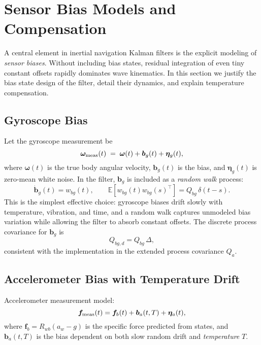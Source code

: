\documentclass[11pt]{article}
\begin{document}
\section{Sensor Bias Models and Compensation}
\label{sec:biases}

A central element in inertial navigation Kalman filters is the explicit modeling of 
\emph{sensor biases}. Without including bias states, residual integration of even tiny 
constant offsets rapidly dominates wave kinematics. In this section we justify the bias 
state design of the filter, detail their dynamics, and explain temperature compensation.

\subsection{Gyroscope Bias}
Let the gyroscope measurement be
\begin{equation}
\bm\omega_{\rm meas}(t) \;=\; \bm\omega(t) + \bm b_g(t) + \bm\eta_g(t),
\label{eq:gyro-meas}
\end{equation}
where $\bm\omega(t)$ is the true body angular velocity, $\bm b_g(t)$ is the bias,
and $\bm\eta_g(t)$ is zero-mean white noise. In the filter, $\bm b_g$ is included as
a \emph{random walk} process:
\begin{equation}
\dot{\bm b}_g(t) = w_{bg}(t),\qquad
\mathbb{E}[w_{bg}(t)w_{bg}(s)^\top] = Q_{bg}\,\delta(t-s).
\label{eq:gyro-bias-model}
\end{equation}
This is the simplest effective choice: gyroscope biases drift slowly with temperature, vibration,
and time, and a random walk captures unmodeled bias variation while allowing the filter to absorb
constant offsets. The discrete process covariance for $\bm b_g$ is
\begin{equation}
Q_{bg,d} = Q_{bg}\,\Delta,
\label{eq:gyro-bias-qd}
\end{equation}
consistent with the implementation in the extended process covariance $Q_a$.

\subsection{Accelerometer Bias with Temperature Drift}
Accelerometer measurement model:
\begin{equation}
\bm f_{\rm meas}(t) = \bm f_b(t) + \bm b_a(t,T) + \bm\eta_a(t),
\label{eq:acc-meas}
\end{equation}
where $\bm f_b=R_{wb}(a_w-g)$ is the specific force predicted from states, and 
$\bm b_a(t,T)$ is the bias dependent on both slow random drift and \emph{temperature} $T$.
\end{document}
